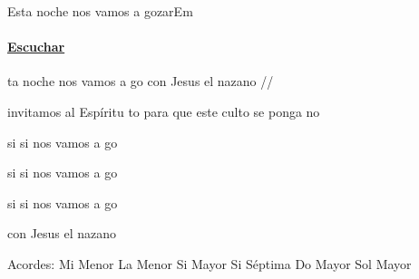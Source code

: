 \documentclass[12pt, spanish]{book}
\begin{document}
    \begin{song}{Esta noche nos vamos a gozar}{Em}
    {} %
    {}
    {} %
    {}
        \ifChordBk
            \paragraph{\mbox{}\hfill\protect\href{https://open.spotify.com/intl-es/track/4h4yTYgWTNQDajRUADHboq}{Escuchar}\mbox{}\hfill}
        \fi

        \begin{SBOpGroup}
            ta noche nos vamos a go con Jesus el nazano //

            invitamos al Espíritu to para que este culto se ponga no
        \end{SBOpGroup}

        \begin{SBChorus}
            si si nos vamos a go

            si si nos vamos a go

            si si nos vamos a go

            con Jesus el nazano
        \end{SBChorus}

        \ifChordBk
        \begin{SBOpGroup}
            Acordes:\break
            \upchord{\Em}\qquad Mi Menor \hfill
            \upchord{\Am}\qquad La Menor \hfill\null\break
            \upchord{\B}\qquad Si Mayor \hfill
            \upchord{\Bseven}\qquad Si S\'eptima \hfill\null\break
            \upchord{\C}\qquad Do Mayor \hfill
            \upchord{\G}\qquad Sol Mayor \hfill\null\break
        \end{SBOpGroup}
        \fi
    \end{song}
\end{document}

